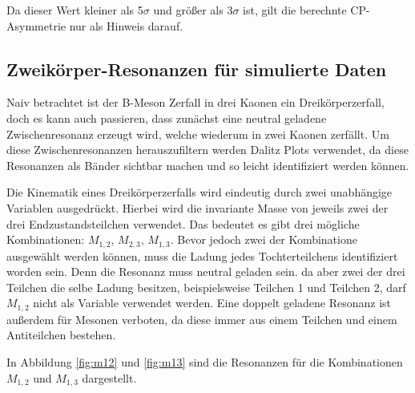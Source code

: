 Da dieser Wert kleiner als 5$\sigma$ und gr\"o\ss er als 3$\sigma$ ist, gilt die berechnte CP-Asymmetrie nur als Hinweis darauf.

\subsection{Zweik\"orper-Resonanzen f\"ur simulierte Daten}
Naiv betrachtet ist der B-Meson Zerfall in drei Kaonen ein Dreik\"orperzerfall, doch es kann auch passieren, dass zun\"achst eine neutral geladene Zwischenresonanz erzeugt wird, welche wiederum in zwei Kaonen zerf\"allt.
Um diese Zwischenresonanzen herauszufiltern werden Dalitz Plots verwendet, da diese Resonanzen als B\"ander sichtbar machen und so leicht identifiziert werden k\"onnen.

Die Kinematik eines Dreik\"orperzerfalls wird eindeutig durch zwei unabh\"angige Variablen ausgedr\"uckt. Hierbei wird die invariante Masse von jeweils zwei der drei Endzustandsteilchen verwendet.
Das bedeutet es gibt drei m\"ogliche Kombinationen:
$M_{1,2}$, $M_{2,3}$, $M_{1,3}$.
Bevor jedoch zwei der Kombinatione ausgew\"ahlt werden k\"onnen, muss die Ladung jedes Tochterteilchens identifiziert worden sein.
Denn die Resonanz muss neutral geladen sein. da aber zwei der drei Teilchen die selbe Ladung besitzen, beispielsweise Teilchen 1 und Teilchen 2, darf $M_{1,2}$ nicht als Variable verwendet werden.
Eine doppelt geladene Resonanz ist au\ss erdem f\"ur Mesonen verboten, da diese immer aus einem Teilchen und einem Antiteilchen bestehen.

In Abbildung \ref{fig:m12} und \ref{fig:m13} sind die Resonanzen f\"ur die Kombinationen $M_{1,2}$ und $M_{1,3}$ dargestellt.


